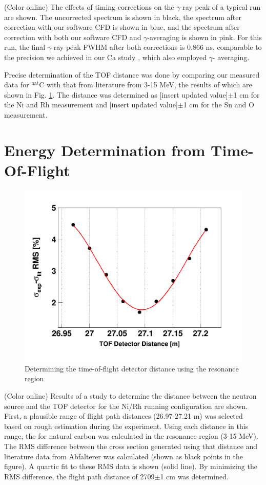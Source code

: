 (Color online) The effects of timing corrections on the $\gamma$-ray
        peak of a typical run are shown. The uncorrected spectrum is shown in black,
        the spectrum after correction with our software CFD is shown in blue,
        and the spectrum after correction with both our software CFD and
        $\gamma$-averaging is 
        shown in pink. For this run, the final $\gamma$-ray peak 
        FWHM after both corrections is 0.866 ns, comparable to the precision we
        achieved in our Ca study \cite{Shane2010}, which also employed $\gamma$-
        averaging.

Precise determination of the TOF distance was done by comparing our measured \totEs data
for $^{\text{nat}}$C with that from literature from 3-15 MeV, the results of which are
shown in Fig. \ref{DistanceStudy}. The distance was determined as [insert
updated value]$\pm$1 cm for the Ni and Rh measurement and [insert updated value]$\pm$1 cm 
for the Sn and O measurement.


\section{Energy Determination from Time-Of-Flight}
\begin{figure}
    \includegraphics[scale=0.3]{figures/DistanceStudyNi.png}
    \caption{Determining the time-of-flight detector distance using the \cNat resonance region}
    \label{DistanceStudy}
\end{figure}

(Color online) Results of a study to determine the distance between
    the neutron source and the TOF detector for the Ni/Rh running configuration
are shown. First, a plausible range of flight path distances (26.97-27.21 m) was
selected based on rough estimation during the experiment. Using each
distance in this range, the \totEs for natural carbon was calculated in the
resonance region (3-15 MeV). The RMS difference between the cross section
generated using that distance and literature data from Abfalterer
\cite{Abfalterer2000, Abfalterer2001} was calculated (shown as black points in
the figure). A quartic fit to these RMS data is shown (solid line). By minimizing the
RMS difference, the flight path distance of 2709$\pm$1 cm was determined.


